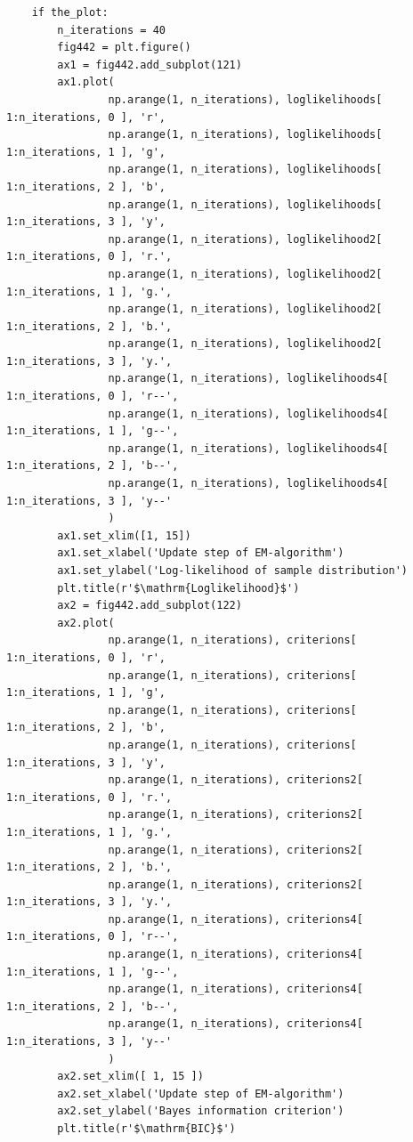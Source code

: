 \begin{verbatim}
    if the_plot:
        n_iterations = 40
        fig442 = plt.figure()
        ax1 = fig442.add_subplot(121)
        ax1.plot(
                np.arange(1, n_iterations), loglikelihoods[ 1:n_iterations, 0 ], 'r',
                np.arange(1, n_iterations), loglikelihoods[ 1:n_iterations, 1 ], 'g',
                np.arange(1, n_iterations), loglikelihoods[ 1:n_iterations, 2 ], 'b',
                np.arange(1, n_iterations), loglikelihoods[ 1:n_iterations, 3 ], 'y',
                np.arange(1, n_iterations), loglikelihood2[ 1:n_iterations, 0 ], 'r.',
                np.arange(1, n_iterations), loglikelihood2[ 1:n_iterations, 1 ], 'g.',
                np.arange(1, n_iterations), loglikelihood2[ 1:n_iterations, 2 ], 'b.',
                np.arange(1, n_iterations), loglikelihood2[ 1:n_iterations, 3 ], 'y.',
                np.arange(1, n_iterations), loglikelihoods4[ 1:n_iterations, 0 ], 'r--',
                np.arange(1, n_iterations), loglikelihoods4[ 1:n_iterations, 1 ], 'g--',
                np.arange(1, n_iterations), loglikelihoods4[ 1:n_iterations, 2 ], 'b--',
                np.arange(1, n_iterations), loglikelihoods4[ 1:n_iterations, 3 ], 'y--'
                )
        ax1.set_xlim([1, 15])
        ax1.set_xlabel('Update step of EM-algorithm')
        ax1.set_ylabel('Log-likelihood of sample distribution')
        plt.title(r'$\mathrm{Loglikelihood}$')
        ax2 = fig442.add_subplot(122)
        ax2.plot(
                np.arange(1, n_iterations), criterions[ 1:n_iterations, 0 ], 'r',
                np.arange(1, n_iterations), criterions[ 1:n_iterations, 1 ], 'g',
                np.arange(1, n_iterations), criterions[ 1:n_iterations, 2 ], 'b',
                np.arange(1, n_iterations), criterions[ 1:n_iterations, 3 ], 'y',
                np.arange(1, n_iterations), criterions2[ 1:n_iterations, 0 ], 'r.',
                np.arange(1, n_iterations), criterions2[ 1:n_iterations, 1 ], 'g.',
                np.arange(1, n_iterations), criterions2[ 1:n_iterations, 2 ], 'b.',
                np.arange(1, n_iterations), criterions2[ 1:n_iterations, 3 ], 'y.',
                np.arange(1, n_iterations), criterions4[ 1:n_iterations, 0 ], 'r--',
                np.arange(1, n_iterations), criterions4[ 1:n_iterations, 1 ], 'g--',
                np.arange(1, n_iterations), criterions4[ 1:n_iterations, 2 ], 'b--',
                np.arange(1, n_iterations), criterions4[ 1:n_iterations, 3 ], 'y--'
                )
        ax2.set_xlim([ 1, 15 ])
        ax2.set_xlabel('Update step of EM-algorithm')
        ax2.set_ylabel('Bayes information criterion')
        plt.title(r'$\mathrm{BIC}$')



\end{verbatim}
